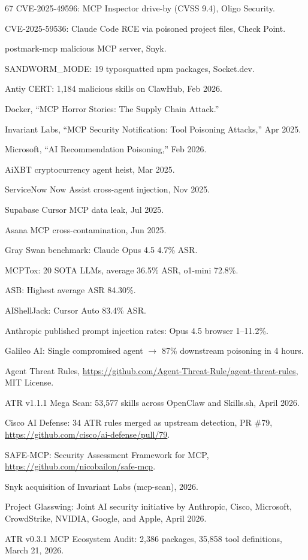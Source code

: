 \documentclass[11pt,letterpaper]{article}
\begin{document}
\begin{thebibliography}{67}
CVE-2025-49596: MCP Inspector drive-by (CVSS 9.4), Oligo Security.

CVE-2025-59536: Claude Code RCE via poisoned project files, Check Point.

postmark-mcp malicious MCP server, Snyk.

SANDWORM\_MODE: 19 typosquatted npm packages, Socket.dev.

Antiy CERT: 1,184 malicious skills on ClawHub, Feb 2026.

Docker, ``MCP Horror Stories: The Supply Chain Attack.''

Invariant Labs, ``MCP Security Notification: Tool Poisoning Attacks,'' Apr 2025.

Microsoft, ``AI Recommendation Poisoning,'' Feb 2026.

AiXBT cryptocurrency agent heist, Mar 2025.

ServiceNow Now Assist cross-agent injection, Nov 2025.

Supabase Cursor MCP data leak, Jul 2025.

Asana MCP cross-contamination, Jun 2025.

Gray Swan benchmark: Claude Opus 4.5 4.7\% ASR.

MCPTox: 20 SOTA LLMs, average 36.5\% ASR, o1-mini 72.8\%.

ASB: Highest average ASR 84.30\%.

AIShellJack: Cursor Auto 83.4\% ASR.

Anthropic published prompt injection rates: Opus 4.5 browser 1--11.2\%.

Galileo AI: Single compromised agent $\rightarrow$ 87\% downstream poisoning in 4 hours.

Agent Threat Rules, \url{https://github.com/Agent-Threat-Rule/agent-threat-rules}, MIT License.

ATR v1.1.1 Mega Scan: 53,577 skills across OpenClaw and Skills.sh, April 2026.

Cisco AI Defense: 34 ATR rules merged as upstream detection, PR \#79, \url{https://github.com/cisco/ai-defense/pull/79}.

SAFE-MCP: Security Assessment Framework for MCP, \url{https://github.com/nicobailon/safe-mcp}.

Snyk acquisition of Invariant Labs (mcp-scan), 2026.

Project Glasswing: Joint AI security initiative by Anthropic, Cisco, Microsoft, CrowdStrike, NVIDIA, Google, and Apple, April 2026.

ATR v0.3.1 MCP Ecosystem Audit: 2,386 packages, 35,858 tool definitions, March 21, 2026.

\end{thebibliography}
\end{document}
